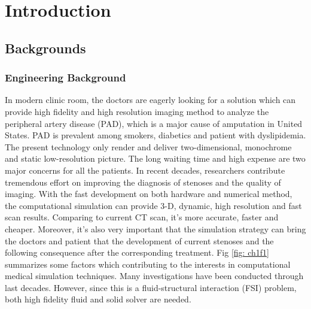 \chapter{Introduction}
\label{ch:chap1}


\section{Backgrounds}

\subsection{Engineering Background}

In modern clinic room, the doctors are eagerly looking for a solution which can provide high fidelity and high resolution imaging method to analyze the peripheral artery disease (PAD), which is a major cause of amputation in United States. PAD is prevalent among smokers, diabetics and patient with dyslipidemia. The  present technology only render and deliver two-dimensional,  monochrome and static low-resolution picture. The long waiting time and high expense are two major concerns for all the patients. In recent decades, researchers contribute tremendous effort on improving the diagnosis of stenoses and the quality of imaging\cite{clark1976fluid, nesbitt2009shear, wardlaw2006non, stergiopulos1992computer, long2001numerical}. With the fast development on both hardware and numerical method, the computational simulation can provide 3-D, dynamic, high resolution and fast scan results. Comparing to current CT scan, it's more accurate, faster and cheaper. Moreover, it's also very important that the simulation strategy can bring the doctors and patient that the development of current stenoses and the following consequence after the corresponding treatment. Fig \ref{fig: ch1f1} summarizes some factors which contributing to the interests in computational medical simulation techniques\cite{barry2005features}. Many investigations have been conducted through last decades\cite{feng2012viscous, bertram2010evaluation, nadeem2010simulation, ogulu2005simulation}. However, since this is a fluid-structural interaction (FSI) problem, both high fidelity fluid and solid solver are needed. 

